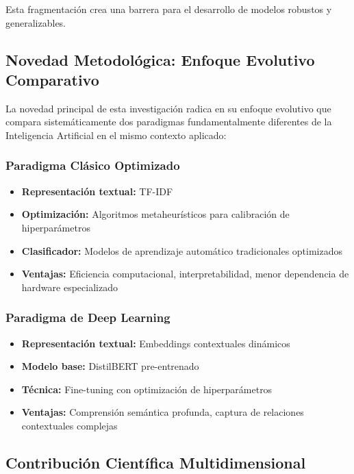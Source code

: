 Esta fragmentación crea una barrera para el desarrollo de modelos robustos y generalizables.

\subsection{Novedad Metodológica: Enfoque Evolutivo Comparativo}

La novedad principal de esta investigación radica en su enfoque evolutivo que compara sistemáticamente dos paradigmas fundamentalmente diferentes de la Inteligencia Artificial en el mismo contexto aplicado:

\subsubsection{Paradigma Clásico Optimizado}
\begin{itemize}
    \item \textbf{Representación textual:} TF-IDF
    \item \textbf{Optimización:} Algoritmos metaheurísticos para calibración de hiperparámetros
    \item \textbf{Clasificador:} Modelos de aprendizaje automático tradicionales optimizados
    \item \textbf{Ventajas:} Eficiencia computacional, interpretabilidad, menor dependencia de hardware especializado
\end{itemize}

\subsubsection{Paradigma de Deep Learning}
\begin{itemize}
    \item \textbf{Representación textual:} Embeddings contextuales dinámicos
    \item \textbf{Modelo base:} DistilBERT pre-entrenado \cite{sanh2019distilbert}
    \item \textbf{Técnica:} Fine-tuning con optimización de hiperparámetros
    \item \textbf{Ventajas:} Comprensión semántica profunda, captura de relaciones contextuales complejas
\end{itemize}

\subsection{Contribución Científica Multidimensional}

